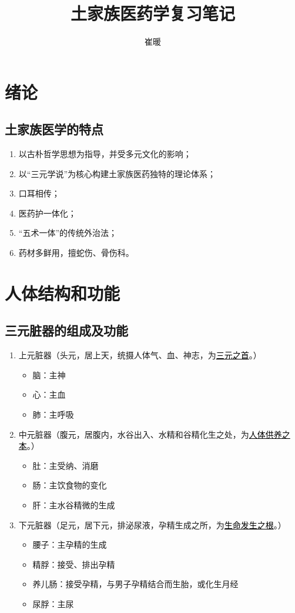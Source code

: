 \documentclass[cn,hazy,black,12pt,normal,founder]{elegantnote}
\title{土家族医药学复习笔记}
\author{崔暖}
\date{\zhtoday}
\newcommand{\redt}[1]{\textcolor{black}{{}#1}}      %
\begin{document}
\maketitle

\section{绪论}

\subsection{土家族医学的特点}

\begin{enumerate}
  \item 以古朴哲学思想为指导，并受多元文化的影响；
  \item 以“三元学说”为核心构建土家族医药独特的理论体系；
  \item 口耳相传；
  \item 医药护一体化；
  \item “五术一体”的传统外治法；
  \item 药材多鲜用，擅蛇伤、骨伤科。
\end{enumerate}

\section{人体结构和功能}

\subsection{三元脏器的组成及功能}

\begin{enumerate}
  \item 上元脏器（头元，居上天，统摄人体气、血、神志，为\redt{\uline{三元之首}}。）
  \begin{itemize}
    \item 脑：主神
    \item 心：主血
    \item 肺：主呼吸
  \end{itemize}
  \item 中元脏器（腹元，居腹内，水谷出入、水精和谷精化生之处，为\redt{\uline{人体供养之本}}。）
  \begin{itemize}
    \item 肚：主受纳、消磨
    \item 肠：主饮食物的变化
    \item 肝：主水谷精微的生成
  \end{itemize}
  \item 下元脏器（足元，居下元，排泌尿液，孕精生成之所，为\redt{\uline{生命发生之根}}。）
  \begin{itemize}
    \item 腰子：主孕精的生成
    \item 精脬：接受、排出孕精
    \item 养儿肠：接受孕精，与男子孕精结合而生胎，或化生月经
    \item 尿脬：主尿
  \end{itemize}
\end{enumerate}
\end{document}
